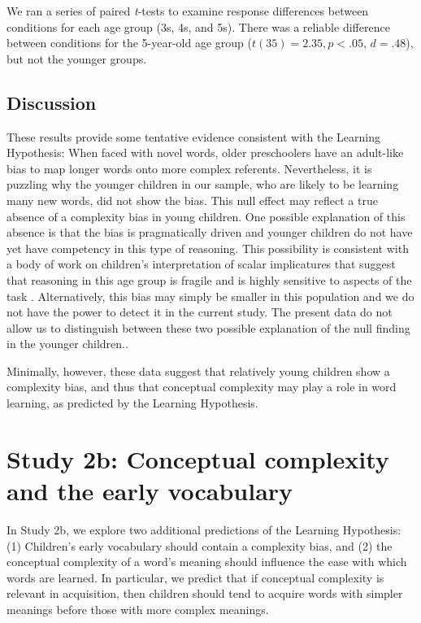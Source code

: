We  ran a series of paired {\it t}-tests to examine response differences between conditions for each age group (3s, 4s, and 5s). There was a reliable difference between conditions for the 5-year-old age group ($t(35) =2.35, p<.05$, $d=.48$), but not the younger groups. 

\subsection{Discussion}
These results provide some tentative evidence consistent with the Learning Hypothesis: When faced with novel words, older  preschoolers have an adult-like bias to map longer words onto more complex referents. Nevertheless, it is puzzling why the younger children in our sample, who are likely to be learning many new words, did not show the bias. This null effect may reflect a true absence of a complexity bias in young children. One possible explanation of this absence is that the bias is pragmatically driven and younger children do not have yet have competency in this type of reasoning. This possibility is consistent with a body of work on children's interpretation of scalar implicatures that suggest that reasoning in this age group is fragile and is highly sensitive to aspects of the task \cite<for a review, see>{horowitz2016the-trouble}. Alternatively, this bias may simply be smaller in this population and we do not have the power to detect it in the current study. The present data do not allow us to distinguish between these two possible explanation of the null finding in the younger children.. 

Minimally, however, these data  suggest that relatively young children show a complexity bias, and thus that conceptual complexity may play a role in word learning,  as predicted by the Learning Hypothesis.

\section{Study 2b: Conceptual complexity and the early vocabulary}
In Study 2b, we explore two additional predictions of the Learning Hypothesis:  (1) Children's early vocabulary should contain a complexity bias, and (2) the conceptual complexity of a word's meaning should influence the ease with which words are learned. In particular, we predict that if conceptual complexity is relevant in acquisition, then children should tend to acquire words with simpler meanings before those with more complex meanings.

